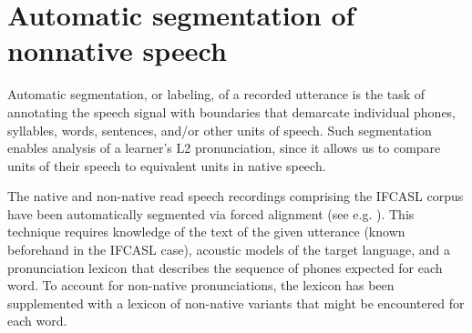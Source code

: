 \section{Automatic segmentation of nonnative speech}
\label{sec:diag:segmentation}

	
	Automatic segmentation, or labeling, of a recorded utterance is the task of annotating the speech signal with boundaries that demarcate individual phones, syllables, words, sentences, and/or other units of speech. Such segmentation enables analysis of a learner's L2 pronunciation, since it allows us to compare units of their speech to equivalent units in native speech. 
	
	
	

	
	The native and non-native read speech recordings comprising the IFCASL corpus \cite{Fauth2014,Trouvain2013} have been automatically segmented via forced alignment (see e.g. \cite{Fohr1996,Mesbahi2011}). This technique requires knowledge of the text of the given utterance (known beforehand in the IFCASL case), acoustic models of the target language, and a pronunciation lexicon that describes the sequence of phones expected for each word. To account for non-native pronunciations, the lexicon has been supplemented with a lexicon of non-native variants that might be encountered for each word. 
	
	
